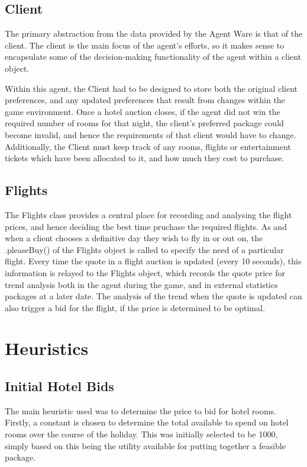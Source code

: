 \documentclass{acm_proc_article-sp}
\begin{document}
 \subsection{Client}
  The primary abstraction from the data provided by the Agent Ware is that of the client.  The client is the main focus of the agent's efforts, so it makes sense to encapsulate some of the decision-making functionality of the agent within a client object.
  
  Within this agent, the Client had to be designed to store both the original client preferences, and any updated preferences that result from changes within the game environment.  Once a hotel auction closes, if the agent did not win the required number of rooms for that night, the client's preferred package could become invalid, and hence the requirements of that client would have to change.  Additionally, the Client must keep track of any rooms, flights or entertainment tickets which have been allocated to it, and how much they cost to purchase.
  
  \subsection{Flights}
   The Flights class provides a central place for recording and analysing the flight prices, and hence deciding the best time pruchase the required flights.  As and when a client chooses a definitive day they wish to fly in or out on, the .pleaseBuy() of the Flights object is called to specify the need of a particular flight.  Every time the quote in a flight auction is updated (every 10 seconds), this information is relayed to the Flights object, which records the quote price for trend analysis both in the agent during the game, and in external statistics packages at a later date.  The analysis of the trend when the quote is updated can also trigger a bid for the flight, if the price is determined to be optimal.

\section{Heuristics}
 \subsection{Initial Hotel Bids}
  The main heuristic used was to determine the price to bid for hotel rooms.  Firstly, a constant is chosen to determine the total available to spend on hotel rooms over the course of the holiday.  This was initially selected to be 1000, simply based on this being the utility available for putting together a feasible package.
  
\end{document}
